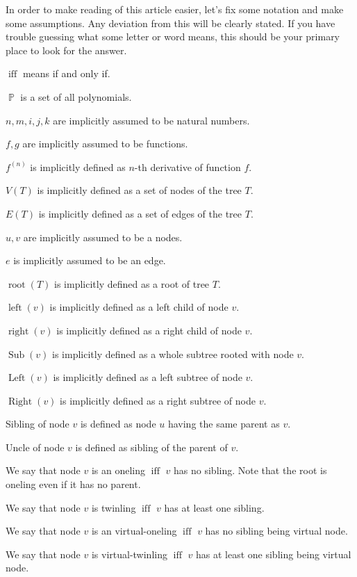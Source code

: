 \documentclass[final]{article}
\theoremstyle{definition}
\theoremstyle{remark}
\DeclareMathOperator{\textiff}{\text{iff}}
\DeclareMathOperator{\poly}{\mathbb{P}}
\DeclareMathOperator{\troot}{\text{root}}
\DeclareMathOperator{\tleft}{\text{left}}
\DeclareMathOperator{\tright}{\text{right}}
\DeclareMathOperator{\tLeft}{\text{Left}}
\DeclareMathOperator{\tRight}{\text{Right}}
\DeclareMathOperator{\tSub}{\text{Sub}}
\begin{document}
In order to make reading of this article easier, let's fix some notation and make some assumptions. Any deviation from this will be clearly stated. If you have trouble guessing what some letter or word means, this should be your primary place to look for the answer.

\(\textiff\) means if and only if.

\(\poly\) is a set of all polynomials.

\(n, m, i, j, k\) are implicitly assumed to be natural numbers.

\(f, g\) are implicitly assumed to be functions.

\(f^{(n)}\) is implicitly defined as \(n\)-th derivative of function \(f\).

\(V(T)\) is implicitly defined as a set of nodes of the tree \(T\).

\(E(T)\) is implicitly defined as a set of edges of the tree \(T\).

\(u, v\) are implicitly assumed to be a nodes.

\(e\) is implicitly assumed to be an edge.

\(\troot(T)\) is implicitly defined as a root of tree \(T\).

\(\tleft(v)\) is implicitly defined as a left child of node \(v\).

\(\tright(v)\) is implicitly defined as a right child of node \(v\).

\(\tSub(v)\) is implicitly defined as a whole subtree rooted with node \(v\).

\(\tLeft(v)\) is implicitly defined as a left subtree of node \(v\).

\(\tRight(v)\) is implicitly defined as a right subtree of node \(v\).

Sibling of node \(v\) is defined as node \(u\) having the same parent as \(v\).

Uncle of node \(v\) is defined as sibling of the parent of \(v\).

We say that node \(v\) is an oneling \(\textiff\) \(v\) has no sibling. Note that the root is oneling even if it has no parent.

We say that node \(v\) is twinling \(\textiff\) \(v\) has at least one sibling.

We say that node \(v\) is an virtual-oneling \(\textiff\) \(v\) has no sibling being virtual node.

We say that node \(v\) is virtual-twinling \(\textiff\) \(v\) has at least one sibling being virtual node.
\end{document}
